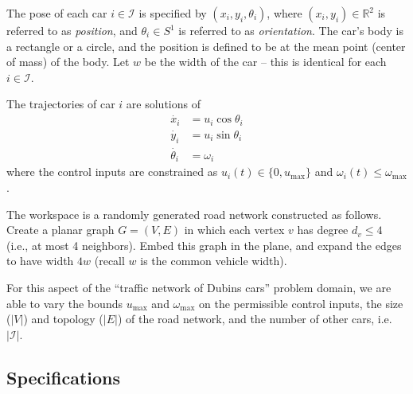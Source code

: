 \documentclass{amsart}
\theoremstyle{definition}
\begin{document}
The pose of each car $i \in {\mathcal I}$ is specified by $(x_i,y_i,\theta_i)$,
where $(x_i,y_i)\in \mathbb{R}^2$ is referred to as \textit{position}, and
$\theta_i \in S^1$ is referred to as \textit{orientation}.  The car's body is a
rectangle or a circle, and the position is defined to be at the mean point
(center of mass) of the body.  Let $w$ be the width of the car -- this is
identical for each $i \in {\mathcal I}$.

The trajectories of car $i$ are solutions of
\begin{align}
\dot{x_i} &= u_i \cos \theta_i \\
\dot{y_i} &= u_i \sin \theta_i \\
\dot{\theta_i} &= \omega_i
\end{align}
where the control inputs are constrained as $u_i(t)\in \{0,u_{\mathrm{max}}\}$ and
$\omega_i(t) \leq \omega_{\mathrm{max}}$.


The workspace is a randomly generated road network constructed as follows.
Create a planar graph $G = (V,E)$ in which each vertex $v$ has degree $d_v \le 4$
(i.e., at most 4 neighbors).  Embed this graph in the plane, and expand the
edges to have width $4w$ (recall $w$ is the common vehicle width).

For this aspect of the ``traffic network of Dubins cars'' problem domain, we are
able to vary the bounds $u_{\mathrm{max}}$ and $\omega_{\mathrm{max}}$ on the
permissible control inputs, the size ($|V|$) and topology ($|E|$) of the road
network, and the number of other cars, i.e. $|\mathcal I|$.


\subsection{Specifications}
\end{document}
